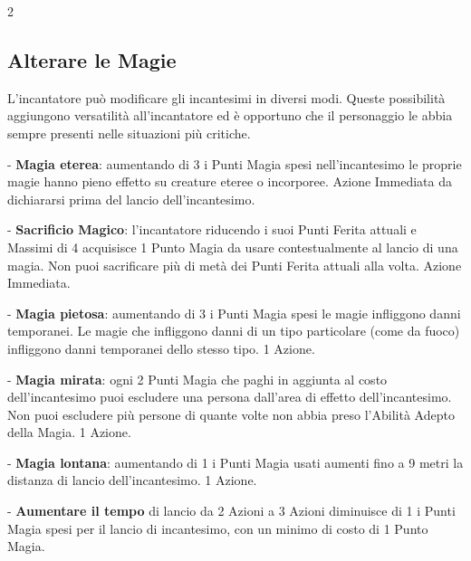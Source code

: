 \begin{multicols}{2}
\subsection{Alterare le Magie}\label{magiealteraremagie}

L'incantatore può modificare gli incantesimi in diversi modi. Queste possibilità aggiungono versatilità all'incantatore ed è opportuno che il personaggio le abbia sempre presenti nelle situazioni più critiche.


- \textbf{Magia eterea}: aumentando di 3 i Punti Magia spesi nell'incantesimo le proprie magie hanno pieno effetto su creature eteree o incorporee. Azione Immediata da dichiararsi prima del lancio dell'incantesimo.

- \textbf{Sacrificio Magico}: l'incantatore riducendo i suoi Punti Ferita attuali e Massimi di 4 acquisisce 1 Punto Magia da usare contestualmente al lancio di una magia. Non puoi sacrificare più di metà dei Punti Ferita attuali alla volta. Azione Immediata.

- \textbf{Magia pietosa}: aumentando di 3 i Punti Magia spesi le magie infliggono danni temporanei. Le magie che infliggono danni di un tipo particolare (come da fuoco) infliggono danni temporanei dello stesso tipo. 1 Azione.

- \textbf{Magia mirata}: ogni 2 Punti Magia che paghi in aggiunta al costo dell'incantesimo puoi escludere una persona dall'area di effetto dell'incantesimo. Non puoi escludere più persone di quante volte non abbia preso l'Abilità Adepto della Magia. 1 Azione. %

- \textbf{Magia lontana}: aumentando di 1 i Punti Magia usati aumenti fino a 9 metri la distanza di lancio dell'incantesimo. 1 Azione.

- \textbf{Aumentare il tempo} di lancio da 2 Azioni a 3 Azioni diminuisce di 1 i Punti Magia spesi per il lancio di incantesimo, con un minimo di costo di 1 Punto Magia.


\end{multicols}
